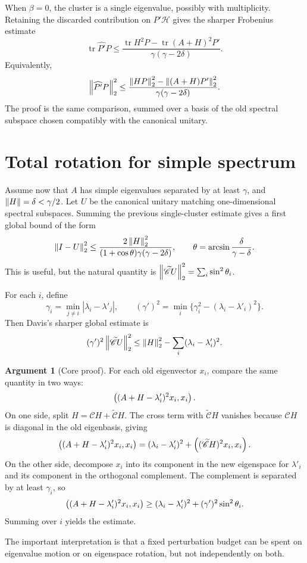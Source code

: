 \documentclass[11pt]{article}
\newcommand{\Hsp}{\mathscr{H}}
\newcommand{\Pinch}{\mathscr{C}}
\newcommand{\Off}{\widetilde{\mathscr{C}}}
\newcommand{\Hsp}{\mathcal{H}}
\newcommand{\Pinch}{\mathcal{D}}
\newcommand{\Off}{\mathcal{D}^{\perp}}
\newcommand{\tr}{\operatorname{tr}}
\newcommand{\Id}{I}
\newcommand{\lam}{\lambda}
\newcommand{\hlam}{\lambda'}
\newcommand{\Pphat}{\widehat{P'}}
\theoremstyle{definition}
\newtheorem{argument}[definition]{Argument}
\begin{document}
When \(\beta=0\), the cluster is a single eigenvalue, possibly with
multiplicity.  Retaining the discarded contribution on \(P'\Hsp\) gives the
sharper Frobenius estimate
\[
  \tr \Pphat P
  \le
  \frac{\tr H^2P-\tr(A+H)^2P'}{\gamma(\gamma-2\delta)}.
\]
Equivalently,
\[
  \norm[2]{\Pphat P}^2
  \le
  \frac{\norm[2]{HP}^2-\norm[2]{(A+H)P'}^2}{\gamma(\gamma-2\delta)}.
\]
The proof is the same comparison, summed over a basis of the old spectral
subspace chosen compatibly with the canonical unitary.

\section{Total rotation for simple spectrum}

Assume now that \(A\) has simple eigenvalues separated by at least \(\gamma\),
and \(\norm{H}=\delta<\gamma/2\).  Let \(U\) be the canonical unitary matching
one-dimensional spectral subspaces.  Summing the previous single-cluster
estimate gives a first global bound of the form
\[
  \norm[2]{\Id-U}^2
  \le
  \frac{2\norm[2]{H}^2}{(1+\cos\theta)\gamma(\gamma-2\delta)},
  \qquad
  \theta=\arcsin\frac{\delta}{\gamma-\delta}.
\]
This is useful, but the natural quantity is
\(\norm[2]{\Off U}^2=\sum_i\sin^2\theta_i\).

For each \(i\), define
\[
  \gamma_i = \min_{j\ne i}|\lam_i-\hlam_j|,
  \qquad
  (\gamma')^2=\min_i\{\gamma_i^2-(\lam_i-\hlam_i)^2\}.
\]
Then Davis's sharper global estimate is
\[
  (\gamma')^2\norm[2]{\Off U}^2
  \le
  \norm[2]{H}^2-
  \sum_i(\lam_i-\hlam_i)^2.
\]

\begin{argument}[Core proof]
For each old eigenvector \(x_i\), compare the same quantity in two ways:
\[
  \inner{(A+H-\hlam_i)^2x_i}{x_i}.
\]
On one side, split \(H=\Pinch H+\Off H\).  The cross term with \(\Off H\)
vanishes because \(\Pinch H\) is diagonal in the old eigenbasis, giving
\[
  \inner{(A+H-\hlam_i)^2x_i}{x_i}
  = (\lam_i-\hlam_i)^2 + \inner{(\Off H)^2x_i}{x_i}.
\]
On the other side, decompose \(x_i\) into its component in the new eigenspace
for \(\hlam_i\) and its component in the orthogonal complement.  The complement
is separated by at least \(\gamma_i\), so
\[
  \inner{(A+H-\hlam_i)^2x_i}{x_i}
  \ge
  (\lam_i-\hlam_i)^2 + (\gamma')^2\sin^2\theta_i.
\]
Summing over \(i\) yields the estimate.
\end{argument}

The important interpretation is that a fixed perturbation budget can be spent
on eigenvalue motion or on eigenspace rotation, but not independently on both.
\end{document}
